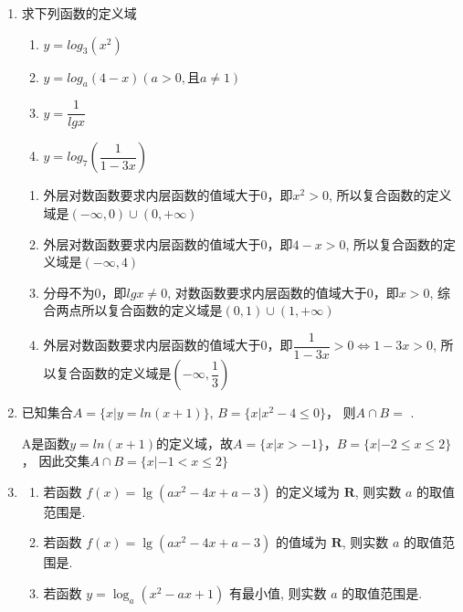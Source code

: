 \begin{enumerate}
    \item 求下列函数的定义域
    \begin{enumerate}
        \item $y = log_3(x^2)$
        \item $y = log_a(4-x) (a > 0, \mbox{且} a \neq 1)$
        \item $y = \dfrac{1}{lgx}$
        \item $y = log_7\left(\dfrac{1}{1-3x}\right)$
    \end{enumerate}
    \begin{jieda}
        \begin{enumerate}
            \item 外层对数函数要求内层函数的值域大于0，即$x^2>0$, 所以复合函数的定义域是$(-\infty, 0) \cup (0, +\infty)$
            \item 外层对数函数要求内层函数的值域大于0，即$4-x>0$, 所以复合函数的定义域是$(-\infty, 4)$
            \item 分母不为0，即$lgx \neq 0$, 对数函数要求内层函数的值域大于0，即$x>0$, 综合两点所以复合函数的定义域是$(0, 1) \cup (1, +\infty)$
            \item 外层对数函数要求内层函数的值域大于0，即$\dfrac{1}{1-3x}>0 \Leftrightarrow 1-3x>0$, 所以复合函数的定义域是$\left(-\infty, \dfrac{1}{3}\right)$
        \end{enumerate}
    \end{jieda}
    \item 已知集合$A = \{x | y = ln(x+1)\}$, $B = \{x | x^2 - 4 \leq 0\}$， 则$A \cap B = $ .
    \begin{jieda}
        A是函数$y = ln(x+1)$的定义域，故$A=\{x|x>-1\}$，$B = \{x|-2 \leq x \leq 2\}$， 因此交集$A \cap B = \{x | -1 < x \leq 2\}$
    \end{jieda}
    \item 
    \begin{enumerate}
    \item 若函数 $f(x)=\lg \left(a x^2-4 x+a-3\right)$ 的定义域为 $\mathbf{R}$, 则实数 $a$ 的取值范围是.
    \item 若函数 $f(x)=\lg \left(a x^2-4 x+a-3\right)$ 的值域为 $\mathbf{R}$, 则实数 $a$ 的取值范围是.
    \item 若函数 $y=\log _a\left(x^2-a x+1\right)$ 有最小值, 则实数 $a$ 的取值范围是.
    \end{enumerate}

\end{enumerate}

